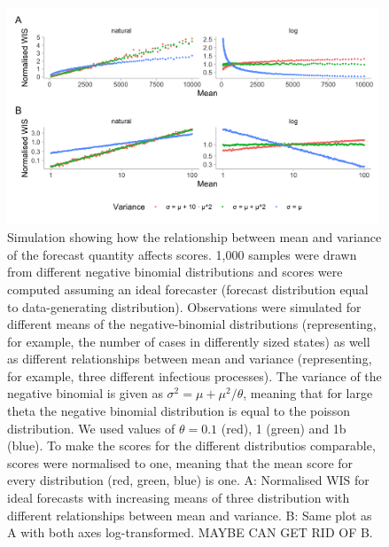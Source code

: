 \documentclass{article}
\begin{document}
\begin{figure}[h!]
    \centering
    \includegraphics[width=0.99\textwidth]{output/figures/SIM-mean-state-size.png}
    \caption{Simulation showing how the relationship between mean and variance of the forecast quantity affects scores. 1,000 samples were drawn from different negative binomial distributions and scores were computed assuming an ideal forecaster (forecast distribution equal to data-generating distribution). Observations were simulated for different means of the negative-binomial distributions (representing, for example, the number of cases in differently sized states) as well as different relationships between mean and variance (representing, for example, three different infectious processes). The variance of the negative binomial is given as $\sigma^2 = \mu + \mu^2 / \theta$, meaning that for large theta the negative binomial distribution is equal to the poisson distribution. We used values of $\theta = 0.1$ (red), 1 (green) and 1b (blue). To make the scores for the different distributios comparable, scores were normalised to one, meaning that the mean score for every distribution (red, green, blue) is one. 
    A: Normalised WIS for ideal forecasts with increasing means of three distribution with different relationships between mean and variance. B: Same plot as A with both axes log-transformed. MAYBE CAN GET RID OF B.}
    \label{fig:SIM-wis-state-size-mean}
\end{figure}
\end{document}
